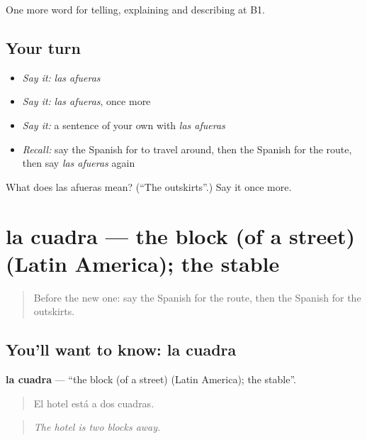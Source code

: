 \begin{grammarlens}[title={What you've built}]
One more word for telling, explaining and describing at B1.
\end{grammarlens}

\subsection*{Your turn}
\begin{itemize}
\raggedright
  \item \emph{Say it:} \emph{las afueras}
  \item \emph{Say it:} \emph{las afueras}, once more
  \item \emph{Say it:} a sentence of your own with \emph{las afueras}
  \item \emph{Recall:} say the Spanish for to travel around, then the Spanish for the route, then say \emph{las afueras} again
\end{itemize}

\begin{tcolorbox}[breakable,colback=teal!4,colframe=teal!35!black,title={Before you move on}]
What does las afueras mean? (\textquotedblleft{}The outskirts\textquotedblright{}.) Say it once more.
\end{tcolorbox}
\section[la cuadra]{la cuadra — the block (of a street) (Latin America); the stable}

\label{lesson:ES-C675-cuadra}



\begin{quote}
Before the new one: say the Spanish for the route, then the Spanish for the outskirts.
\end{quote}

\subsection*{You'll want to know: la cuadra}
\textbf{la cuadra} — \textquotedblleft{}the block (of a street) (Latin America); the stable\textquotedblright{}.

\begin{quote}
El hotel está a dos cuadras.
\end{quote}

\begin{quote}
\emph{The hotel is two blocks away.}
\end{quote}

